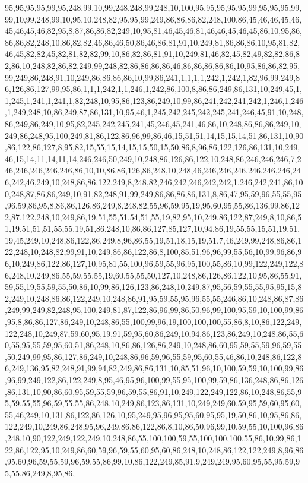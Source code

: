 95,95,95,95,99,95,248,99,10,99,248,248,99,248,10,100,95,95,95,95,95,99,95,95,95,99,99,10,99,248,99,10,95,10,248,82,95,95,99,249,86,86,86,82,248,100,86,45,46,46,45,46,45,46,45,46,82,95,8,87,86,86,82,249,10,95,81,46,45,46,81,46,46,45,46,45,86,10,95,86,86,86,82,248,10,86,82,82,46,86,46,50,86,46,86,81,91,10,249,81,86,86,86,10,95,81,82,46,45,82,82,45,82,81,82,82,99,10,86,82,86,81,91,10,249,81,46,82,45,82,49,82,82,86,82,86,10,248,82,86,82,249,99,248,82,86,86,86,86,46,86,86,86,86,86,10,95,86,86,82,95,99,249,86,248,91,10,249,86,86,86,86,10,99,86,241,1,1,1,1,242,1,242,1,82,96,99,249,86,126,86,127,99,95,86,1,1,1,242,1,1,246,1,242,86,100,8,86,86,249,86,131,10,249,45,1,1,245,1,241,1,241,1,82,248,10,95,86,123,86,249,10,99,86,241,242,241,242,1,246,1,246,1,249,248,10,86,249,87,86,131,10,95,46,1,245,242,245,242,245,241,246,45,91,10,248,86,249,86,249,10,95,82,245,242,245,241,45,246,45,241,46,86,10,248,86,86,86,249,10,249,86,248,95,100,249,81,86,122,86,96,99,86,46,15,51,51,14,15,15,14,51,86,131,10,90,86,122,86,127,8,95,82,15,55,15,14,15,15,50,15,50,86,8,96,86,122,126,86,131,10,249,46,15,14,11,14,11,14,246,246,50,249,10,248,86,126,86,122,10,248,86,246,246,246,7,246,246,246,246,246,86,10,10,86,86,126,86,248,10,248,46,246,246,246,246,246,246,246,242,46,249,10,248,86,86,122,249,8,248,82,246,242,246,242,242,1,246,242,241,86,100,248,87,86,86,249,10,91,82,248,91,99,249,86,86,86,86,131,8,86,47,95,59,96,55,55,95,96,59,86,95,8,86,86,126,86,249,8,248,82,55,96,59,95,19,95,60,95,55,86,136,99,86,122,87,122,248,10,249,86,19,51,55,51,54,51,55,19,82,95,10,249,86,122,87,249,8,10,86,51,19,51,51,51,55,55,19,51,86,248,10,86,86,127,85,127,10,94,86,19,55,55,15,51,19,51,19,45,249,10,248,86,122,86,249,8,96,86,55,19,51,18,15,19,51,7,46,249,99,248,86,86,122,248,10,248,82,99,91,10,249,86,86,122,86,8,100,85,51,96,96,99,55,56,10,99,96,86,96,10,249,86,122,86,127,10,95,81,55,100,96,59,55,96,95,100,55,86,10,99,122,249,122,86,248,10,249,86,55,59,55,55,19,60,55,55,50,127,10,248,86,126,86,122,10,95,86,55,91,59,55,19,55,59,55,50,86,10,99,86,126,123,86,248,10,249,87,95,56,59,55,55,95,95,15,82,249,10,248,86,86,122,249,10,248,86,91,95,59,55,95,96,55,55,246,86,10,248,86,87,86,249,99,249,82,248,95,100,249,81,87,122,86,96,99,86,50,96,99,100,95,59,10,100,99,86,95,8,86,86,127,86,249,10,248,86,55,100,99,96,19,100,100,100,55,86,8,10,86,122,249,122,248,10,249,87,59,60,95,19,91,59,95,60,86,249,10,94,86,123,86,249,10,248,86,55,60,55,95,55,59,95,60,51,86,248,10,86,86,126,86,249,10,248,86,60,95,59,55,59,96,59,55,50,249,99,95,86,127,86,249,10,248,86,96,59,96,55,59,95,60,55,46,86,10,248,86,122,86,249,136,95,82,248,91,99,94,82,249,86,86,131,10,85,51,96,10,100,59,59,10,100,99,86,96,99,249,122,86,122,249,8,95,46,95,96,100,99,55,95,100,99,59,86,136,248,86,86,126,86,131,10,90,86,60,95,59,55,59,96,59,55,86,91,10,249,122,249,122,86,10,248,86,55,95,59,55,55,96,59,55,55,86,248,10,249,86,123,86,131,10,249,249,60,59,95,59,60,95,60,55,46,249,10,131,86,122,86,126,10,95,249,95,96,95,95,60,95,95,19,50,86,10,95,86,86,122,249,10,249,86,248,95,96,249,86,86,122,86,8,10,86,50,96,99,10,59,55,10,100,96,86,248,10,90,122,249,122,249,10,248,86,55,100,100,59,55,100,100,100,55,86,10,99,86,122,86,122,95,10,249,86,60,59,96,59,55,60,95,60,86,248,10,248,86,122,122,249,8,96,86,95,60,96,59,55,59,96,59,55,86,99,10,86,122,249,85,91,9,249,249,95,60,95,55,95,59,95,55,86,249,8,95,86,
